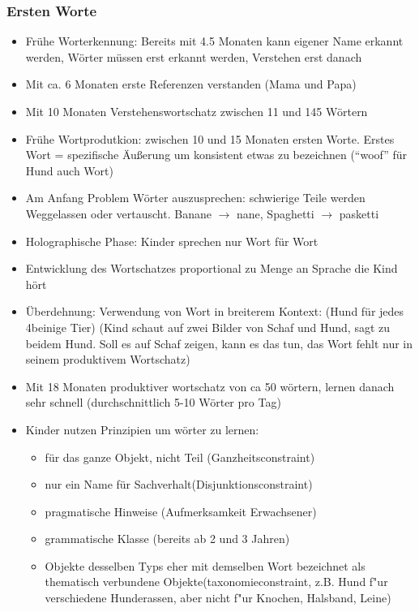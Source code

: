 \subsubsection{Ersten Worte}
\begin{itemize}
	\item
		Frühe Worterkennung: Bereits mit 4.5 Monaten kann eigener Name erkannt werden, Wörter müssen erst erkannt werden, Verstehen erst danach
	\item
		Mit ca. 6 Monaten erste Referenzen verstanden (Mama und Papa)
	\item
		Mit 10 Monaten Verstehenswortschatz zwischen 11 und 145 Wörtern
	\item
		Frühe Wortprodutkion: zwischen 10 und 15 Monaten ersten Worte. Erstes Wort = spezifische Äußerung um konsistent etwas zu bezeichnen (\enquote{woof} für Hund auch Wort)
	\item
		Am Anfang Problem Wörter auszusprechen: schwierige Teile werden Weggelassen oder vertauscht. Banane $\rightarrow$ nane, Spaghetti $\rightarrow$ pasketti
	\item
		Holographische Phase: Kinder sprechen nur Wort für Wort
	\item
		Entwicklung des Wortschatzes proportional zu Menge an Sprache die Kind hört
	\item
		Überdehnung: Verwendung von Wort in breiterem Kontext: (Hund für jedes 4beinige Tier) (Kind schaut auf zwei Bilder von Schaf und Hund, sagt zu beidem Hund. Soll es auf Schaf zeigen, kann es das tun, das Wort fehlt nur in seinem produktivem Wortschatz)
	\item
		Mit 18 Monaten produktiver wortschatz von ca 50 wörtern, lernen danach sehr schnell (durchschnittlich 5-10 Wörter pro Tag)
	\item
		Kinder nutzen Prinzipien um wörter zu lernen:
		\begin{itemize}
			\item für das ganze Objekt, nicht Teil (Ganzheitsconstraint)
			\item  nur ein Name für Sachverhalt(Disjunktionsconstraint)
			\item  pragmatische Hinweise (Aufmerksamkeit Erwachsener)
			\item grammatische Klasse (bereits ab 2 und 3 Jahren)
			\item	Objekte desselben Typs eher mit demselben Wort bezeichnet als thematisch verbundene Objekte(taxonomieconstraint, z.B. Hund f"ur verschiedene Hunderassen, aber nicht f"ur Knochen, Halsband, Leine)
		\end{itemize}
\end{itemize}
